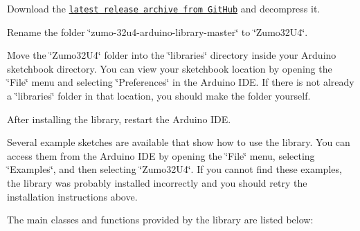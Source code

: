 \begin{DoxyEnumerate}
\item Download the \href{https://github.com/pololu/zumo-32u4-arduino-library}{\tt latest release archive from Git\+Hub} and decompress it.
\item Rename the folder \char`\"{}zumo-\/32u4-\/arduino-\/library-\/master\char`\"{} to \char`\"{}\+Zumo32\+U4\char`\"{}.
\item Move the \char`\"{}\+Zumo32\+U4\char`\"{} folder into the \char`\"{}libraries\char`\"{} directory inside your Arduino sketchbook directory. You can view your sketchbook location by opening the \char`\"{}\+File\char`\"{} menu and selecting \char`\"{}\+Preferences\char`\"{} in the Arduino I\+DE. If there is not already a \char`\"{}libraries\char`\"{} folder in that location, you should make the folder yourself.
\item After installing the library, restart the Arduino I\+DE.
\end{DoxyEnumerate}

Several example sketches are available that show how to use the library. You can access them from the Arduino I\+DE by opening the \char`\"{}\+File\char`\"{} menu, selecting \char`\"{}\+Examples\char`\"{}, and then selecting \char`\"{}\+Zumo32\+U4\char`\"{}. If you cannot find these examples, the library was probably installed incorrectly and you should retry the installation instructions above.

The main classes and functions provided by the library are listed below\+:


